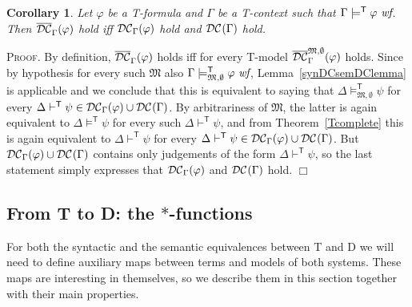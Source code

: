 \documentclass{article}
\newtheorem{corollary}[definition]{Corollary}
\newenvironment{proof}{\smallskip\textsc{Proof.}}{\hspace*{\fill}$\Box$}
\newcommand{\D}{\textsf D}
\newcommand{\T}{\textsf T}
\newcommand{\wf}{\ \mbox{\em wf}}
\newcommand{\myvdash}[1]{\ensuremath{\vdash^{\mathsf{#1}}}}
\newcommand{\mymodels}[1]{\ensuremath{\models^{\mathsf{#1}}}}
\newcommand{\mymodelss}[3]{\ensuremath{\models_{\mathfrak{#2},{#3}}^{\mathsf{#1}}}}
\newcommand{\synDC}[1][{}]{\ifthenelse{\equal{#1}{}}{%
{\ensuremath{{\cal{DC}}}}}{%
{\ensuremath{{\cal{DC}}_{#1}}}}}
\newcommand{\semDC}[2][{\mathfrak M},\rho]{\ensuremath{\overline{\cal{DC}}^{#1}_{#2}}}
\begin{document}
\begin{corollary}\label{synDCsemDC}
Let $\varphi$ be a {\T}-formula and $\Gamma$ be a {\T}-context such
that $\Gamma\mymodels{T}\varphi\wf$.  Then
$\semDC[{}]{\Gamma}(\varphi)$ hold iff $\synDC[\Gamma](\varphi)$ hold
and $\synDC(\Gamma)$ hold.
\end{corollary}
\begin{proof}
By definition, $\semDC[{}]{\Gamma}(\varphi)$ holds iff for every {\T}-model
$\semDC[\mathfrak M,\emptyset]{\Gamma}(\varphi)$ holds.  Since by hypothesis
for every such $\mathfrak M$ also
$\Gamma\mymodelss{T}M\emptyset\varphi\wf$, Lemma~\ref{synDCsemDClemma}
is applicable and we conclude that this is equivalent to saying that
$\Delta\mymodelss{T}M\emptyset\psi$ for every
$\Delta\myvdash{T}\psi\in\synDC[\Gamma](\varphi)\cup\synDC(\Gamma)$.
By arbitrariness of $\mathfrak M$, the latter is again equivalent to
$\Delta\mymodels{T}\psi$ for every such $\Delta\myvdash{T}\psi$, and
from Theorem~\ref{Tcomplete} this is again equivalent to
$\Delta\myvdash{T}\psi$ for every
$\Delta\myvdash{T}\psi\in\synDC[\Gamma](\varphi)\cup\synDC(\Gamma)$.
But $\synDC[\Gamma](\varphi)\cup\synDC(\Gamma)$ contains only judgements
of the form $\Delta\myvdash{T}\psi$, so the last statement simply
expresses that $\synDC[\Gamma](\varphi)$ and $\synDC(\Gamma)$ hold.
\end{proof}

\subsection{From {\T} to {\D}: the $\ast$-functions}

For both the syntactic and the semantic equivalences between {\T} and {\D}
we will need to define auxiliary maps between terms and models of both
systems.  These maps are interesting in themselves, so we describe them
in this section together with their main properties.
\end{document}
